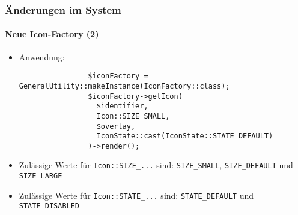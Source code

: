 \begin{frame}[fragile]
	\frametitle{Änderungen im System}
	\framesubtitle{Neue Icon-Factory (2)}

	\lstset{basicstyle=\tiny\ttfamily}

	\begin{itemize}

		\item Anwendung:

			\begin{lstlisting}
				$iconFactory = GeneralUtility::makeInstance(IconFactory::class);
				$iconFactory->getIcon(
				  $identifier,
				  Icon::SIZE_SMALL,
				  $overlay,
				  IconState::cast(IconState::STATE_DEFAULT)
				)->render();
			\end{lstlisting}

		\item Zulässige Werte für \texttt{Icon::SIZE\_...} sind:\newline
			\small\texttt{SIZE\_SMALL}, \texttt{SIZE\_DEFAULT} und \texttt{SIZE\_LARGE}\normalsize
			\vspace{0.4cm}

		\item Zulässige Werte für \texttt{Icon::STATE\_...} sind:\newline
			\small\texttt{STATE\_DEFAULT} und \texttt{STATE\_DISABLED}\normalsize

	\end{itemize}

\end{frame}

